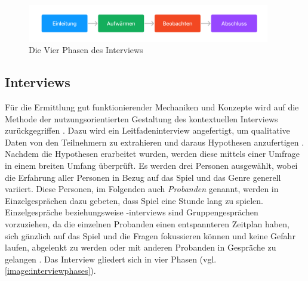 
\begin{figure}
    \begin{center}
        \includegraphics[width=400px]{0.bilder/interviewphases.png}
    \end{center}
    \caption{Die Vier Phasen des Interviews} \label{image:interviewphases}
\end{figure}
\subsection{Interviews}
Für die Ermittlung gut funktionierender Mechaniken und Konzepte wird auf die Methode der nutzungsorientierten Gestaltung des kontextuellen Interviews zurückgegriffen \cite*[]{holtzblatt_beyer_1997}. Dazu wird ein Leitfadeninterview angefertigt, um qualitative Daten von den Teilnehmern zu extrahieren und daraus Hypothesen anzufertigen \cite*[]{baur_blasius}. Nachdem die Hypothesen erarbeitet wurden, werden diese mittels einer Umfrage in einem breiten Umfang überprüft. Es werden drei Personen ausgewählt, wobei die Erfahrung aller Personen in Bezug auf das Spiel und das Genre generell variiert. Diese Personen, im Folgenden auch \textit{Probanden} genannt, werden in Einzelgesprächen dazu gebeten, dass Spiel eine Stunde lang zu spielen. Einzelgespräche beziehungsweise -interviews sind Gruppengesprächen vorzuziehen, da die einzelnen Probanden einen entspannteren Zeitplan haben, sich gänzlich auf das Spiel und die Fragen fokussieren können und keine Gefahr laufen, abgelenkt zu werden oder mit anderen Probanden in Gespräche zu gelangen \cite*[]{lankoski_bjork}. Das Interview gliedert sich in vier Phasen (vgl. \autoref{image:interviewphases}).

